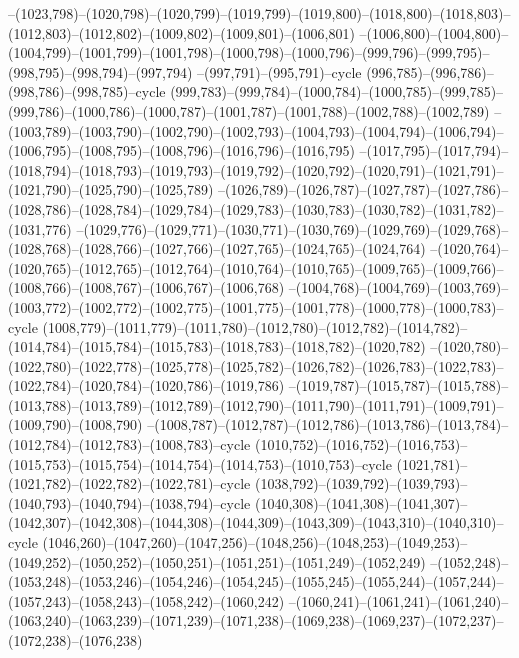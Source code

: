 --(1023,798)--(1020,798)--(1020,799)--(1019,799)--(1019,800)--(1018,800)--(1018,803)--(1012,803)--(1012,802)--(1009,802)--(1009,801)--(1006,801)
--(1006,800)--(1004,800)--(1004,799)--(1001,799)--(1001,798)--(1000,798)--(1000,796)--(999,796)--(999,795)--(998,795)--(998,794)--(997,794)
--(997,791)--(995,791)--cycle
(996,785)--(996,786)--(998,786)--(998,785)--cycle
(999,783)--(999,784)--(1000,784)--(1000,785)--(999,785)--(999,786)--(1000,786)--(1000,787)--(1001,787)--(1001,788)--(1002,788)--(1002,789)
--(1003,789)--(1003,790)--(1002,790)--(1002,793)--(1004,793)--(1004,794)--(1006,794)--(1006,795)--(1008,795)--(1008,796)--(1016,796)--(1016,795)
--(1017,795)--(1017,794)--(1018,794)--(1018,793)--(1019,793)--(1019,792)--(1020,792)--(1020,791)--(1021,791)--(1021,790)--(1025,790)--(1025,789)
--(1026,789)--(1026,787)--(1027,787)--(1027,786)--(1028,786)--(1028,784)--(1029,784)--(1029,783)--(1030,783)--(1030,782)--(1031,782)--(1031,776)
--(1029,776)--(1029,771)--(1030,771)--(1030,769)--(1029,769)--(1029,768)--(1028,768)--(1028,766)--(1027,766)--(1027,765)--(1024,765)--(1024,764)
--(1020,764)--(1020,765)--(1012,765)--(1012,764)--(1010,764)--(1010,765)--(1009,765)--(1009,766)--(1008,766)--(1008,767)--(1006,767)--(1006,768)
--(1004,768)--(1004,769)--(1003,769)--(1003,772)--(1002,772)--(1002,775)--(1001,775)--(1001,778)--(1000,778)--(1000,783)--cycle
(1008,779)--(1011,779)--(1011,780)--(1012,780)--(1012,782)--(1014,782)--(1014,784)--(1015,784)--(1015,783)--(1018,783)--(1018,782)--(1020,782)
--(1020,780)--(1022,780)--(1022,778)--(1025,778)--(1025,782)--(1026,782)--(1026,783)--(1022,783)--(1022,784)--(1020,784)--(1020,786)--(1019,786)
--(1019,787)--(1015,787)--(1015,788)--(1013,788)--(1013,789)--(1012,789)--(1012,790)--(1011,790)--(1011,791)--(1009,791)--(1009,790)--(1008,790)
--(1008,787)--(1012,787)--(1012,786)--(1013,786)--(1013,784)--(1012,784)--(1012,783)--(1008,783)--cycle
(1010,752)--(1016,752)--(1016,753)--(1015,753)--(1015,754)--(1014,754)--(1014,753)--(1010,753)--cycle
(1021,781)--(1021,782)--(1022,782)--(1022,781)--cycle
(1038,792)--(1039,792)--(1039,793)--(1040,793)--(1040,794)--(1038,794)--cycle
(1040,308)--(1041,308)--(1041,307)--(1042,307)--(1042,308)--(1044,308)--(1044,309)--(1043,309)--(1043,310)--(1040,310)--cycle
(1046,260)--(1047,260)--(1047,256)--(1048,256)--(1048,253)--(1049,253)--(1049,252)--(1050,252)--(1050,251)--(1051,251)--(1051,249)--(1052,249)
--(1052,248)--(1053,248)--(1053,246)--(1054,246)--(1054,245)--(1055,245)--(1055,244)--(1057,244)--(1057,243)--(1058,243)--(1058,242)--(1060,242)
--(1060,241)--(1061,241)--(1061,240)--(1063,240)--(1063,239)--(1071,239)--(1071,238)--(1069,238)--(1069,237)--(1072,237)--(1072,238)--(1076,238)
